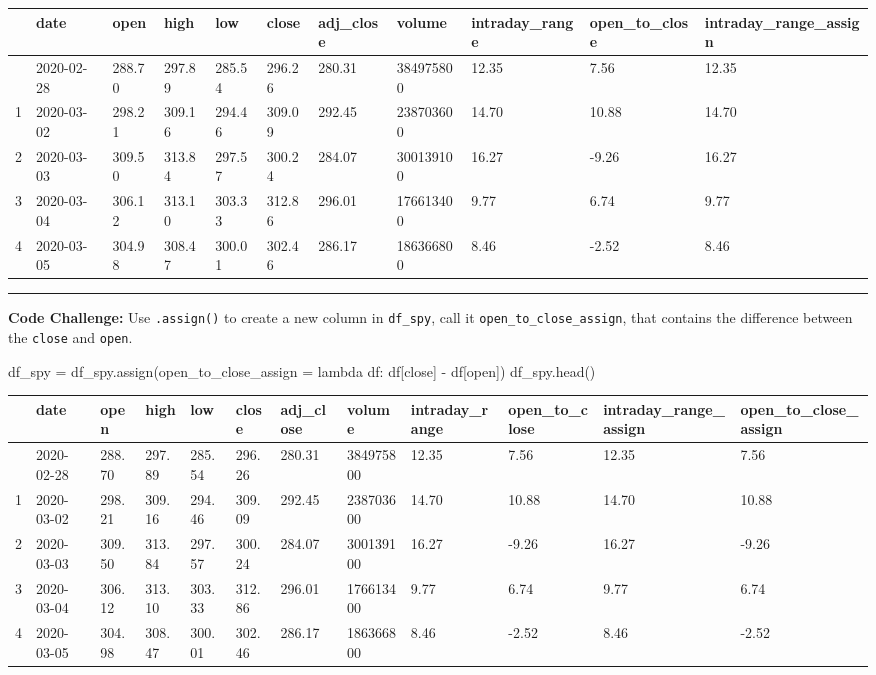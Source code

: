 \documentclass[
  letterpaper,
  DIV=11,
  numbers=noendperiod]{scrreprt}
\newenvironment{Shaded}{\begin{snugshade}}{\end{snugshade}}
\newcommand{\KeywordTok}[1]{\textcolor[rgb]{0.00,0.23,0.31}{#1}}
\newcommand{\NormalTok}[1]{\textcolor[rgb]{0.00,0.23,0.31}{#1}}
\newcommand{\OperatorTok}[1]{\textcolor[rgb]{0.37,0.37,0.37}{#1}}
\newcommand{\StringTok}[1]{\textcolor[rgb]{0.13,0.47,0.30}{#1}}
\begin{document}
\begin{longtable}[]{@{}lllllllllll@{}}
\toprule\noalign{}
& date & open & high & low & close & adj\_close & volume &
intraday\_range & open\_to\_close & intraday\_range\_assign \\
\midrule\noalign{}
\endhead
\bottomrule\noalign{}
\endlastfoot
0 & 2020-02-28 & 288.70 & 297.89 & 285.54 & 296.26 & 280.31 & 384975800
& 12.35 & 7.56 & 12.35 \\
1 & 2020-03-02 & 298.21 & 309.16 & 294.46 & 309.09 & 292.45 & 238703600
& 14.70 & 10.88 & 14.70 \\
2 & 2020-03-03 & 309.50 & 313.84 & 297.57 & 300.24 & 284.07 & 300139100
& 16.27 & -9.26 & 16.27 \\
3 & 2020-03-04 & 306.12 & 313.10 & 303.33 & 312.86 & 296.01 & 176613400
& 9.77 & 6.74 & 9.77 \\
4 & 2020-03-05 & 304.98 & 308.47 & 300.01 & 302.46 & 286.17 & 186366800
& 8.46 & -2.52 & 8.46 \\
\end{longtable}

\begin{center}\rule{0.5\linewidth}{0.5pt}\end{center}

\textbf{Code Challenge:} Use \texttt{.assign()} to create a new column
in \texttt{df\_spy}, call it \texttt{open\_to\_close\_assign}, that
contains the difference between the \texttt{close} and \texttt{open}.

\begin{Shaded}
\begin{Highlighting}[]
\NormalTok{df\_spy }\OperatorTok{=}\NormalTok{ df\_spy.assign(open\_to\_close\_assign }\OperatorTok{=} \KeywordTok{lambda}\NormalTok{ df: df[}\StringTok{\textquotesingle{}close\textquotesingle{}}\NormalTok{] }\OperatorTok{{-}}\NormalTok{ df[}\StringTok{\textquotesingle{}open\textquotesingle{}}\NormalTok{])}
\NormalTok{df\_spy.head()}
\end{Highlighting}
\end{Shaded}

\begin{longtable}[]{@{}llllllllllll@{}}
\toprule\noalign{}
& date & open & high & low & close & adj\_close & volume &
intraday\_range & open\_to\_close & intraday\_range\_assign &
open\_to\_close\_assign \\
\midrule\noalign{}
\endhead
\bottomrule\noalign{}
\endlastfoot
0 & 2020-02-28 & 288.70 & 297.89 & 285.54 & 296.26 & 280.31 & 384975800
& 12.35 & 7.56 & 12.35 & 7.56 \\
1 & 2020-03-02 & 298.21 & 309.16 & 294.46 & 309.09 & 292.45 & 238703600
& 14.70 & 10.88 & 14.70 & 10.88 \\
2 & 2020-03-03 & 309.50 & 313.84 & 297.57 & 300.24 & 284.07 & 300139100
& 16.27 & -9.26 & 16.27 & -9.26 \\
3 & 2020-03-04 & 306.12 & 313.10 & 303.33 & 312.86 & 296.01 & 176613400
& 9.77 & 6.74 & 9.77 & 6.74 \\
4 & 2020-03-05 & 304.98 & 308.47 & 300.01 & 302.46 & 286.17 & 186366800
& 8.46 & -2.52 & 8.46 & -2.52 \\
\end{longtable}
\end{document}
